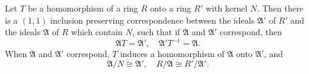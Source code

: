 Let $T$ be a homomorphism of a ring $R$ onto a ring $R'$ with kernel $N$. Then there is a $(1,1)$ inclusion preserving correspondence between the ideals $\mathfrak{A}'$ of $R'$ and the ideals $\mathfrak{A}$ of $R$ which contain $N$, such that if $\mathfrak{A}$ and $\mathfrak{A}'$ correspond, then
$$\mathfrak{A}T = \mathfrak{A}', \quad \mathfrak{A}'T^{-1} = \mathfrak{A}.$$
When $\mathfrak{A}$ and $\mathfrak{A}'$ correspond, $T$ induces a homomorphism of $\mathfrak{A}$ onto $\mathfrak{A}'$, and
$$\mathfrak{A}/N \cong \mathfrak{A}', \quad R/\mathfrak{A} \cong R'/\mathfrak{A}'.$$
